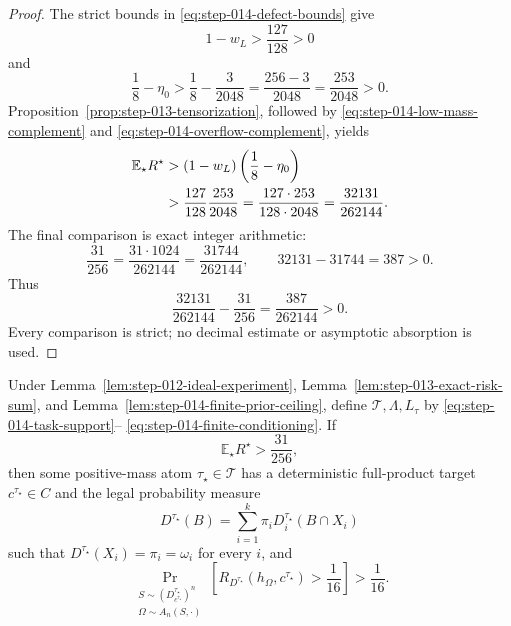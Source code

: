 \begin{proof}
The strict bounds in \eqref{eq:step-014-defect-bounds} give
\begin{equation}\label{eq:step-014-low-mass-complement}
1-w_L>\frac{127}{128}>0
\end{equation}
and
\begin{equation}\label{eq:step-014-overflow-complement}
\frac18-\eta_0
>\frac18-\frac3{2048}
=\frac{256-3}{2048}
=\frac{253}{2048}>0.
\end{equation}
Proposition~\ref{prop:step-013-tensorization}, followed by
\eqref{eq:step-014-low-mass-complement} and
\eqref{eq:step-014-overflow-complement}, yields
\begin{align}
\mathbb E_\star R^\star
&>(1-w_L)\left(\frac18-\eta_0\right)\notag\\
&>\frac{127}{128}\frac{253}{2048}
=\frac{127\cdot253}{128\cdot2048}
=\frac{32131}{262144}.
\label{eq:step-014-product-gap}
\end{align}
The final comparison is exact integer arithmetic:
\begin{equation}\label{eq:step-014-integer-gap}
\frac{31}{256}
=\frac{31\cdot1024}{262144}
=\frac{31744}{262144},
\qquad
32131-31744=387>0.
\end{equation}
Thus
\begin{equation}\label{eq:step-014-positive-margin}
\frac{32131}{262144}-\frac{31}{256}
=\frac{387}{262144}>0.
\end{equation}
Every comparison is strict; no decimal estimate or asymptotic
absorption is used.
\end{proof}

\begin{proposition}
\label{prop:step-014-deterministic-atom}
Under Lemma~\ref{lem:step-012-ideal-experiment},
Lemma~\ref{lem:step-013-exact-risk-sum}, and
Lemma~\ref{lem:step-014-finite-prior-ceiling}, define
\(\mathcal T,\Lambda,L_\tau\) by
\eqref{eq:step-014-task-support}--%
\eqref{eq:step-014-finite-conditioning}.  If
\begin{equation}\label{eq:step-014-average-above-ceiling}
\mathbb E_\star R^\star>\frac{31}{256},
\end{equation}
then some positive-mass atom \(\tau_\star\in\mathcal T\) has a
deterministic full-product target \(c^{\tau_\star}\in C\) and the legal
probability measure
\begin{equation}\label{eq:step-014-selected-mixture}
D^{\tau_\star}(B)
=\sum_{i=1}^k\pi_i
D_i^{\tau_\star}(B\cap X_i)
\end{equation}
such that \(D^{\tau_\star}(X_i)=\pi_i=\omega_i\) for every \(i\), and
\begin{equation}\label{eq:step-014-selected-pac-failure}
\Pr_{\substack{S\sim(D^{\tau_\star}_{c^{\tau_\star}})^n\\
                \Omega\sim A_n(S,\cdot)}}
\left[
R_{D^{\tau_\star}}(h_\Omega,c^{\tau_\star})
>\frac1{16}
\right]
>\frac1{16}.
\end{equation}
\end{proposition}


